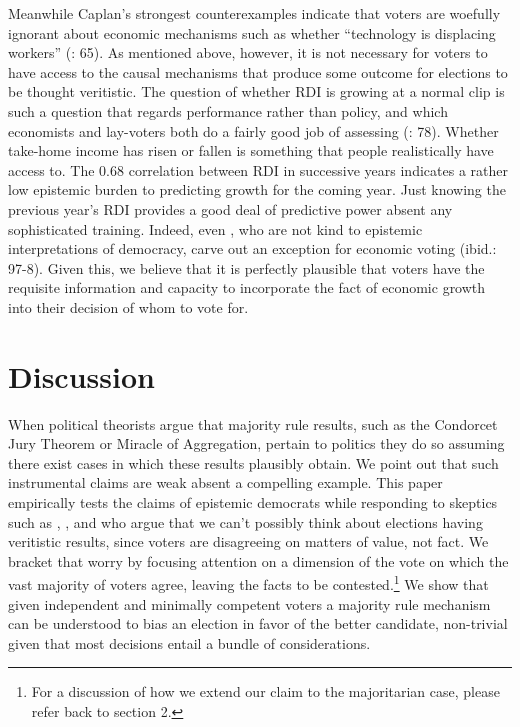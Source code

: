 \documentclass[11pt]{article}
\begin{document}
Meanwhile Caplan's strongest counterexamples  indicate that voters are woefully ignorant about economic mechanisms such as whether ``technology is displacing workers'' (\cite{Caplan2006}: 65). As mentioned above, however, it is not necessary for voters to have access to the causal mechanisms that produce some outcome for elections to be thought veritistic. The question of whether RDI is growing at a normal clip is such a question that regards performance rather than policy, and which economists and lay-voters both do a fairly good job of assessing (\cite{Caplan2006}: 78). Whether take-home income has risen or fallen is something that people realistically have access to. The 0.68 correlation between RDI in successive years indicates  a rather low epistemic burden to predicting growth for the coming year. Just knowing the previous year's RDI provides a good deal of predictive power absent any sophisticated training. Indeed, even \cite{achen2016democracy}, who are not kind to epistemic interpretations of democracy, carve out an exception for economic voting (ibid.: 97-8). Given this, we believe that it is perfectly plausible that voters have the requisite information and capacity to incorporate the fact of economic growth into their decision of whom to vote for.


\section{Discussion}

When political  theorists argue that majority rule results, such as the Condorcet Jury Theorem or Miracle of Aggregation, pertain to politics they do so assuming there exist cases in which these results plausibly obtain. We point out that such instrumental claims are weak absent a compelling example.
This paper empirically tests the claims of epistemic democrats while responding to skeptics such as \citet{Anderson2006}, \citet{Ingham2013}, and \cite{urbinati2014democracy} who argue that we can't possibly think about elections having veritistic results, since voters are disagreeing on matters of value, not fact. We bracket that worry by focusing attention on a dimension of the vote on which the vast majority of voters agree, leaving the facts to be contested.\footnote{For a discussion of how we extend our claim to the majoritarian case, please refer back to section 2.}
We show that given independent and minimally competent voters a majority rule mechanism can be understood  to bias an election in favor of the better candidate, non-trivial given that most decisions entail a bundle of considerations.%
\end{document}
